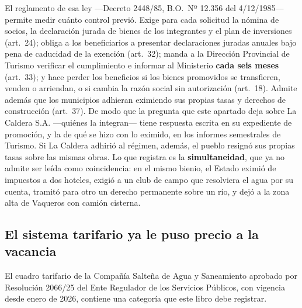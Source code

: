 \begin{cautela}
El reglamento de esa ley ---Decreto 2448/85, B.O.\ Nº 12.356 del 4/12/1985--- permite medir cuánto control previó. Exige para cada solicitud la nómina de socios, la declaración jurada de bienes de los integrantes y el plan de inversiones (art.\ 24); obliga a los beneficiarios a presentar declaraciones juradas anuales bajo pena de caducidad de la exención (art.\ 32); manda a la Dirección Provincial de Turismo verificar el cumplimiento e informar al Ministerio \textbf{cada seis meses} (art.\ 33); y hace perder los beneficios si los bienes promovidos se transfieren, venden o arriendan, o si cambia la razón social sin autorización (art.\ 18). Admite además que los municipios adhieran eximiendo sus propias tasas y derechos de construcción (art.\ 37). De modo que la pregunta que este apartado deja sobre La Caldera S.A. ---quiénes la integran--- tiene respuesta escrita en su expediente de promoción, y la de qué se hizo con lo eximido, en los informes semestrales de Turismo. Si La Caldera adhirió al régimen, además, el pueblo resignó sus propias tasas sobre las mismas obras. Lo que registra es la \textbf{simultaneidad}, que ya no admite ser leída como coincidencia: en el mismo bienio, el Estado eximió de impuestos a dos hoteles, exigió a un club de campo que resolviera el agua por su cuenta, tramitó para otro un derecho permanente sobre un río, y dejó a la zona alta de Vaqueros con camión cisterna.
\end{cautela}


\subsection*{El sistema tarifario ya le puso precio a la vacancia}

El cuadro tarifario de la Compañía Salteña de Agua y Saneamiento aprobado por Resolución 2066/25 del Ente Regulador de los Servicios Públicos, con vigencia desde enero de 2026, contiene una categoría que este libro debe registrar.

